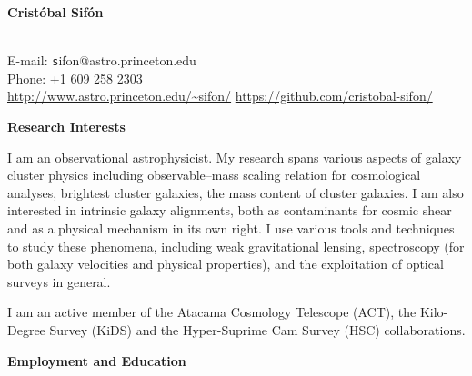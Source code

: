 \documentclass[11pt]{article}
\begin{document}
\begin{minipage}[b]{0.46\linewidth}
\flushleft
\hspace{-0.7cm}
{\bf\huge Crist\'obal Sif\'on}\\\vspace{0.2cm}
\\
\end{minipage}
\begin{minipage}[b]{0.49\linewidth}
\flushright
{\large E-mail: {\texttt sifon@astro.princeton.edu}\\
        Phone: +1 609 258 2303\\
        \url{http://www.astro.princeton.edu/~sifon/}
        \url{https://github.com/cristobal-sifon/}}
\end{minipage}
\vspace{0.4cm}
\hline

\vspace{0.5cm}
\noindent
{\bf\Large Research Interests}\\

{\large
I am an observational astrophysicist.
My research spans various aspects of galaxy cluster physics including observable--mass scaling relation for cosmological analyses, brightest cluster galaxies, the mass content of cluster galaxies. I am also interested in intrinsic galaxy alignments, both as contaminants for cosmic shear and as a physical mechanism in its own right. I use various tools and techniques to study these phenomena, including weak gravitational lensing, spectroscopy (for both galaxy velocities and physical properties), and the exploitation of optical surveys in general.

I am an active member of the Atacama Cosmology Telescope (ACT), the Kilo-Degree Survey (KiDS) and the Hyper-Suprime Cam Survey (HSC) collaborations.
}


\vspace{0.5cm}
\noindent
{\bf\Large Employment and Education}\\
\vspace{-0.2cm}
\end{document}
